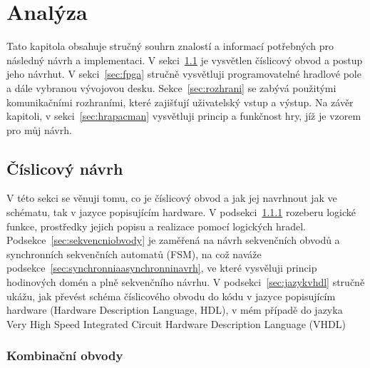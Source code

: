 \documentclass{report}
\begin{document}
\chapter{Analýza}
Tato kapitola obsahuje stručný souhrn znalostí a informací potřebných pro následný návrh a implementaci. V sekci~\ref{sec:cislicovynavrh} je vysvětlen číslicový obvod a postup jeho návrhut. V sekci~\ref{sec:fpga} stručně vysvětluji programovatelné hradlové pole a dále vybranou vývojovou desku. Sekce~\ref{sec:rozhrani} se zabývá použitými komunikačními rozhraními, které zajišťují uživatelský vstup a výstup. Na závěr kapitoli, v sekci~\ref{sec:hrapacman} vysvětluji princip a funkčnost hry, jíž je vzorem pro můj návrh.

\section{Číslicový návrh}\label{sec:cislicovynavrh}
V této sekci se věnuji tomu, co je číslicový obvod a jak jej navrhnout jak ve schématu, tak v jazyce popisujícím hardware. V podsekci~\ref{sec:kombinacniobvody} rozeberu logické funkce, prostředky jejich popisu a realizace pomocí logických hradel. Podsekce~\ref{sec:sekvencniobvody}  je zaměřená na návrh sekvenčních obvodů a synchronních sekvenčních automatů (FSM), na což naváže podsekce~\ref{sec:synchronniaasynchronninavrh}, ve které vysvěluji princip hodinových domén a plně sekvenčního návrhu. V podsekci~\ref{sec:jazykvhdl} stručně ukážu, jak převést schéma číslicového obvodu do kódu v jazyce popisujícím hardware (Hardware Description Language, HDL), v mém případě do jazyka Very High Speed Integrated Circuit Hardware Description Language (VHDL)

\subsection{Kombinační obvody}\label{sec:kombinacniobvody}
\end{document}
